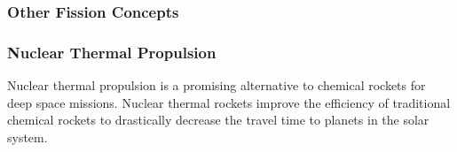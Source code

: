     \subsubsection{Other Fission Concepts}

    \subsubsection { Nuclear Thermal Propulsion }

    Nuclear thermal propulsion is a promising alternative to chemical rockets for
    deep space missions. Nuclear thermal rockets improve the efficiency of
    traditional chemical rockets to drastically decrease the travel time to planets
    in the solar system. 
